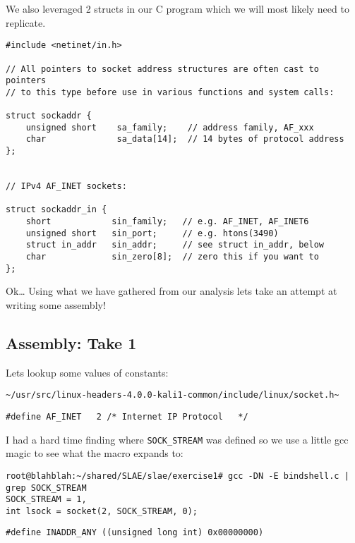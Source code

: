 \documentclass[11pt]{article}
\begin{document}
We also leveraged 2 structs in our C program which we will most likely need
to replicate.

\begin{verbatim}
#include <netinet/in.h>

// All pointers to socket address structures are often cast to pointers
// to this type before use in various functions and system calls:

struct sockaddr {
    unsigned short    sa_family;    // address family, AF_xxx
    char              sa_data[14];  // 14 bytes of protocol address
};


// IPv4 AF_INET sockets:

struct sockaddr_in {
    short            sin_family;   // e.g. AF_INET, AF_INET6
    unsigned short   sin_port;     // e.g. htons(3490)
    struct in_addr   sin_addr;     // see struct in_addr, below
    char             sin_zero[8];  // zero this if you want to
};
\end{verbatim}


Ok\ldots{} Using what we have gathered from our analysis lets take an attempt at
writing some assembly!

\subsection{Assembly: Take 1}
\label{sec-1-6}

Lets lookup some values of constants:

\begin{verbatim}
~/usr/src/linux-headers-4.0.0-kali1-common/include/linux/socket.h~
\end{verbatim}

\begin{verbatim}
#define AF_INET   2 /* Internet IP Protocol   */
\end{verbatim}

I had a hard time finding where \verb~SOCK_STREAM~ was defined so we use
a little gcc magic to see what the macro expands to:

\begin{verbatim}
root@blahblah:~/shared/SLAE/slae/exercise1# gcc -DN -E bindshell.c | grep SOCK_STREAM
SOCK_STREAM = 1,
int lsock = socket(2, SOCK_STREAM, 0);
\end{verbatim}

\begin{verbatim}
#define INADDR_ANY ((unsigned long int) 0x00000000)
\end{verbatim}
\end{document}
